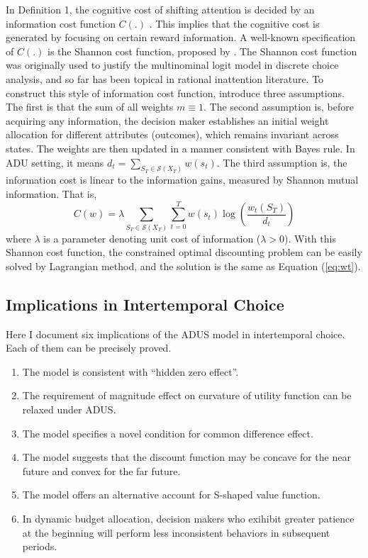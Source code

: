 \documentclass[
  12pt,
]{article}
\begin{document}
In Definition 1, the cognitive cost of shifting attention is decided by
an information cost function \(C(.)\) . This implies that the cognitive
cost is generated by focusing on certain reward information. A
well-known specification of \(C(.)\) is the Shannon cost function,
proposed by \citet{matejka_rational_2015}. The Shannon cost function was
originally used to justify the multinominal logit model in discrete
choice analysis, and so far has been topical in rational inattention
literature. To construct this style of information cost function,
\citet{matejka_rational_2015} introduce three assumptions. The first is
that the sum of all weights \(m\equiv1\). The second assumption is,
before acquiring any information, the decision maker establishes an
initial weight allocation for different attributes (outcomes), which
remains invariant across states. The weights are then updated in a
manner consistent with Bayes rule. In ADU setting, it means
\(d_t=\sum_{S_T\in \mathcal{S}(X_T)} w(s_t)\). The third assumption is,
the information cost is linear to the information gains, measured by
Shannon mutual information. That
is,\[ C(w)= \lambda \sum_{S_T\in \mathcal{S}(X_T)}\sum_{t=0}^T w(s_t) \log\left(\frac{w_t(S_T)}{d_t}\right) \]where
\(\lambda\) is a parameter denoting unit cost of information
(\(\lambda>0\)). With this Shannon cost function, the constrained
optimal discounting problem can be easily solved by Lagrangian method,
and the solution is the same as Equation (\ref{eq:wt}).

\hypertarget{implications-in-intertemporal-choice}{%
\subsection{Implications in Intertemporal
Choice}\label{implications-in-intertemporal-choice}}

Here I document six implications of the ADUS model in intertemporal
choice. Each of them can be precisely proved.

\begin{enumerate}
\def\labelenumi{\arabic{enumi}.}
\item
  The model is consistent with ``hidden zero effect''.
\item
  The requirement of magnitude effect on curvature of utility function
  can be relaxed under ADUS.
\item
  The model specifies a novel condition for common difference effect.
\item
  The model suggests that the discount function may be concave for the
  near future and convex for the far future.
\item
  The model offers an alternative account for S-shaped value function.
\item
  In dynamic budget allocation, decision makers who exihibit greater
  patience at the beginning will perform less inconsistent behaviors in
  subsequent periods.
\end{enumerate}
\end{document}
